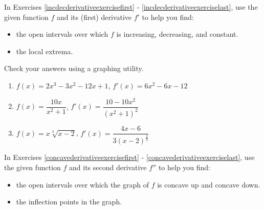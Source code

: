 \documentclass{ximera}
\begin{document}
	\author{Stitz-Zeager}



\label{ExercisesforAppDerivatives}


In Exercises \ref{incdecderivativeexercisefirst} - \ref{incdecderivativeexerciselast},  use the given function $f$ and its (first) derivative $f'$ to help you find:

\begin{itemize}

\item the open intervals over which $f$ is increasing, decreasing, and constant.

\item the local extrema.

\end{itemize}

Check your answers using a graphing utility.

\begin{enumerate}

\item\label{incdecderivativeexercisefirst} $f(x) = 2x^{3}-3x^{2}-12x + 1$, $f'(x) = 6x^2-6x-12$ %

\smallskip

\item $f(x) = \dfrac{10x}{x^2+1}$, $f'(x) = \dfrac{10-10x^2}{\left(x^2+1\right)^2}$ %

\smallskip

\item\label{incdecderivativeexerciselast} $f(x) = x \sqrt[3]{x-2}$, $f'(x)=\dfrac{4x-6}{3(x-2)^{\frac{2}{3}}}$ %

\smallskip

\setcounter{HW}{\value{enumi}}
\end{enumerate}

In Exercises \ref{concavederivativeexercisefirst} - \ref{concavederivativeexerciselast},  use the given function $f$ and its second derivative $f''$ to help you find:

\begin{itemize}

\item  the open intervals over which the graph of $f$ is concave up and concave down.

\item  the inflection points in the graph.

\end{itemize}
\end{document}
